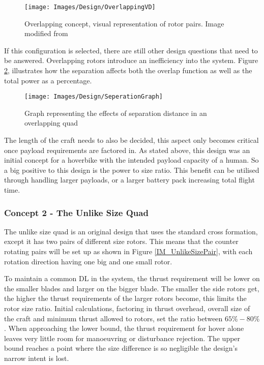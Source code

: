 			\begin{figure}[H]
			\centering
			\texttt{[image: Images/Design/OverlappingVD]}
			\caption{Overlapping concept, visual representation of rotor pairs. Image modified from \cite{MAHover}}
			\label{IM_OverlappingPair}
			\end{figure}
			If this configuration is selected, there are still other design questions that need to be answered. Overlapping rotors introduce an inefficiency into the system. Figure \ref{IM_SeperationGraph}, illustrates how the separation affects both the overlap function as well as the total power as a percentage.
			\begin{figure}[]
			\centering
			\texttt{[image: Images/Design/SeperationGraph]}
			\caption{Graph representing the effects of separation distance in an overlapping quad}
			\label{IM_SeperationGraph}
			\end{figure}
			The length of the craft needs to also be decided, this aspect only becomes critical once payload requirements are factored in. As stated above, this design was an initial concept for a hoverbike with the intended payload capacity of a human. So a big positive to this design is the power to size ratio. This benefit can be utilised through handling larger payloads, or a larger battery pack increasing total flight time.

			\subsubsection{Concept 2 - The Unlike Size Quad}
			The unlike size quad is an original design that uses the standard cross formation, except it has two pairs of different size rotors. This means that the counter rotating pairs will be set up as shown in Figure \ref{IM_UnlikeSizePair}, with each rotation direction having one big and one small rotor. 
			
			To maintain a common DL in the system, the thrust requirement will be lower on the smaller blades and larger on the bigger blade. The smaller the side rotors get, the higher the thrust requirements of the larger rotors become, this limits the rotor size ratio. Initial calculations, factoring in thrust overhead, overall size of the craft and minimum thrust allowed to rotors, set the ratio between $65\% - 80\%$.  When approaching the lower bound, the thrust requirement for hover alone leaves very little room for manoeuvring or disturbance rejection. The upper bound reaches a point where the size difference is so negligible the design's narrow intent is lost.
			
